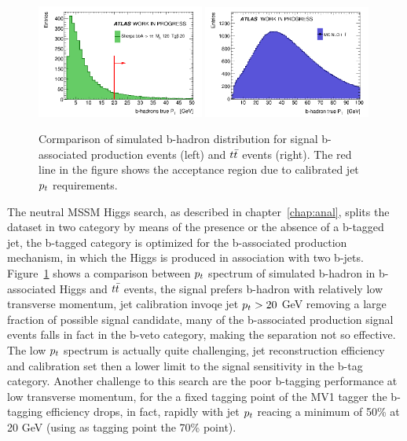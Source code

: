 \begin{figure}[tp]
     \begin{center}

            \includegraphics[width=0.49\textwidth]{figure/trackjet/bbA_pt.png}
            \includegraphics[width=0.49\textwidth]{figure/trackjet/top_pt.png}

    \end{center}
    \caption{Cormparison of simulated b-hadron distribution for signal b-associated production events (left) and $t\bar{t}$ events (right).
	The red line in the figure shows the acceptance region due to calibrated jet $p_{t}$ requirements.}
   \label{fig:bjetDistro}
\end{figure}

The neutral MSSM Higgs search, as described in chapter~\ref{chap:anal}, splits the dataset in two category
by means of the presence or the absence of a b-tagged jet, the b-tagged category is optimized for the b-associated production 
mechanism, in which the Higgs is produced in association with two b-jets. Figure~\ref{fig:bjetDistro} shows a comparison 
between $p_{t}$ spectrum of simulated b-hadron in b-associated Higgs  and $t\bar{t}$ events, the signal prefers b-hadron with 
relatively low transverse momentum,  jet calibration invoqe jet $p_{t} > 20$ GeV removing a large fraction of possible
signal candidate, many of the b-associated production signal events falls in fact in the b-veto category, making 
the separation not so effective.
The low $p_{t}$ spectrum is actually quite challenging, jet reconstruction efficiency and calibration set then a lower limit
to the signal sensitivity in the b-tag category.
Another challenge to this search are the poor b-tagging performance at low transverse momentum, for the a fixed tagging point of the 
MV1 tagger the b-tagging efficiency drops, in fact,  rapidly  with jet $p_{t}$ reacing a minimum of 50\% at 20 GeV \cite{BtaggingScaleFactors,BtaggingScaleFactorsNew}
(using as tagging point the 70\% point).

